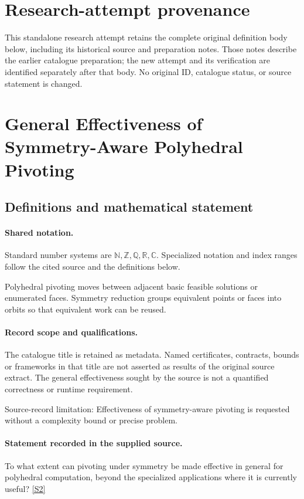 \documentclass[11pt]{article}
\begin{document}
\section*{Research-attempt provenance}
This standalone research attempt retains the complete original definition body below,
including its historical source and preparation notes. Those notes describe the
earlier catalogue preparation; the new attempt and its verification are identified
separately after that body. No original ID, catalogue status, or source statement is changed.

\section{General Effectiveness of Symmetry-Aware Polyhedral Pivoting}\label{statement}

\subsection{Definitions and mathematical statement}

\paragraph{Shared notation.}Standard number systems are $\mathbb N,\mathbb Z,\mathbb Q,\mathbb R,\mathbb C$. Specialized notation and index ranges follow the cited source and the definitions below.


Polyhedral pivoting moves between adjacent basic feasible solutions or enumerated faces. Symmetry reduction groups equivalent points or faces into orbits so that equivalent work can be reused.
\paragraph{Record scope and qualifications.}
The catalogue title is retained as metadata. Named certificates, contracts, bounds or frameworks in that title are not asserted as results of the original source extract.
The general effectiveness sought by the source is not a quantified correctness or runtime requirement.

Source-record limitation: Effectiveness of symmetry-aware pivoting is requested without a complexity bound or precise problem.
\paragraph{Statement recorded in the supplied source.}
To what extent can pivoting under symmetry be made effective in general for polyhedral computation, beyond the specialized applications where it is currently useful? \href{https://doi.org/10.4171/owr/2010/38}{[S2]}
\end{document}
